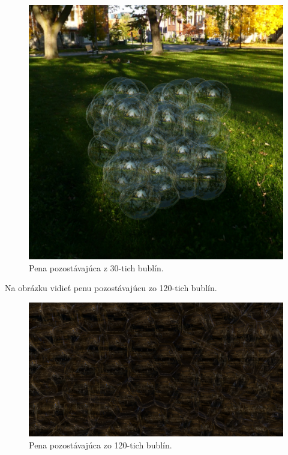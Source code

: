 \begin{figure}[H]
	\begin{center}
		\includegraphics[width=\textwidth]{images/30-bubbles}
		\caption{Pena pozostávajúca z 30-tich bublín.}
		\label{img:30-bubbles-foam}
	\end{center}
\end{figure}
\newpage
Na obrázku  vidieť penu pozostávajúcu zo 120-tich bublín.
\begin{figure}[H]
	\begin{center}
		\includegraphics[width=\textwidth]{images/120-bubbles}
		\caption{Pena pozostávajúca zo 120-tich bublín.}
		\label{img:120-bubbles-foam}
	\end{center}
\end{figure}

